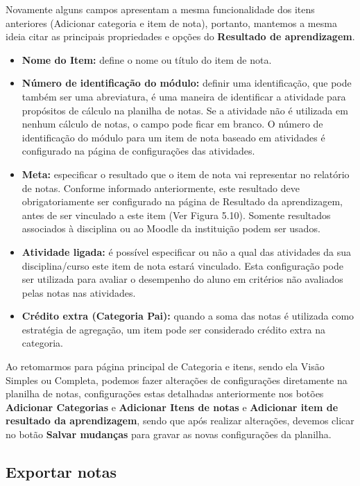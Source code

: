 Novamente alguns campos apresentam a mesma funcionalidade dos itens anteriores (Adicionar categoria e item de nota), portanto, mantemos a mesma ideia citar as principais propriedades e opções do \textbf{Resultado de aprendizagem}.

\begin{itemize}
 \item \textbf{Nome do Item:} define o nome ou título do item de nota.
\item \textbf{Número de identificação do módulo:} definir uma identificação, que pode também ser uma abreviatura, é uma maneira de identificar a atividade para propósitos de cálculo na planilha de notas. Se a atividade não é utilizada em nenhum cálculo de notas, o campo pode ficar em branco. O número de identificação do módulo para um item de nota baseado em atividades é configurado na página de configurações das atividades.
\item \textbf{Meta:} especificar o resultado que o item de nota vai representar no relatório de notas. Conforme informado anteriormente, este resultado deve obrigatoriamente ser configurado na página de Resultado da aprendizagem, antes de ser vinculado a este item (Ver Figura 5.10). Somente resultados associados à disciplina ou ao Moodle da instituição podem ser usados.
\item \textbf{Atividade ligada:} é possível especificar ou não a qual das atividades da sua disciplina/curso este item de nota estará vinculado. Esta configuração pode ser utilizada para avaliar o desempenho do aluno em critérios não avaliados pelas notas nas atividades.
\item \textbf{Crédito extra (Categoria Pai):} quando a soma das notas é utilizada como estratégia de agregação, um item pode ser considerado crédito extra na categoria.
\end{itemize}

Ao retomarmos para página principal de Categoria e itens, sendo ela Visão Simples ou Completa, podemos fazer alterações de configurações diretamente na planilha de notas, configurações estas detalhadas anteriormente nos botões \textbf{Adicionar Categorias} e \textbf{Adicionar Itens de notas} e \textbf{Adicionar item de resultado da aprendizagem}, sendo que após realizar alterações, devemos clicar no botão \textbf{Salvar mudanças} para gravar as novas configurações da planilha.

\subsection{Exportar notas}

